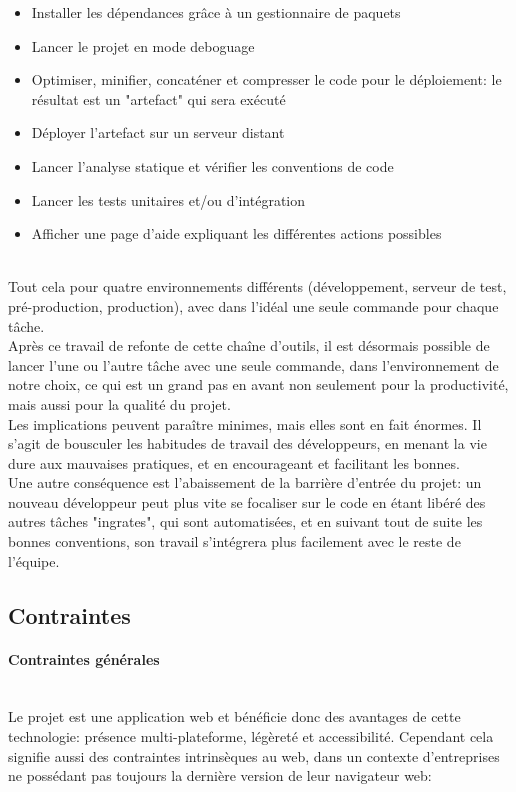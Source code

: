 \documentclass[a4paper,french,12pt]{article}
\begin{document}
	\begin{itemize}
		\item Installer les dépendances grâce à un gestionnaire de paquets
		\item Lancer le projet en mode deboguage
		\item Optimiser, minifier, concaténer et compresser le code pour le déploiement: le résultat est un "artefact" qui sera exécuté
		\item Déployer l'artefact sur un serveur distant
		\item Lancer l'analyse statique et vérifier les conventions de code
		\item Lancer les tests unitaires et/ou d'intégration
		\item Afficher une page d'aide expliquant les différentes actions possibles
	\end{itemize}	 ~\\
	
	Tout cela pour quatre environnements différents (développement, serveur de test, pré-production, production), avec dans l'idéal une seule commande pour chaque tâche.~\\	
	
	Après ce travail de refonte de cette chaîne d'outils, il est désormais possible de lancer l'une ou l'autre tâche avec une seule commande, dans l'environnement de notre choix, ce qui est un grand pas en avant non seulement pour la productivité, mais aussi pour la qualité du projet. ~\\	
	
	Les implications peuvent paraître minimes, mais elles sont en fait énormes. Il s'agit de bousculer les habitudes de travail des développeurs, en menant la vie dure aux mauvaises pratiques, et en encourageant et facilitant les bonnes.~\\	
	
	Une autre conséquence est l'abaissement de la barrière d'entrée du projet: un nouveau développeur peut plus vite se focaliser sur le code en étant libéré des autres tâches "ingrates", qui sont automatisées, et en suivant tout de suite les bonnes conventions, son travail s'intégrera plus facilement avec le reste de l'équipe.
				

	\subsection{Contraintes}
	
	\paragraph{Contraintes générales} ~\\
	Le projet est une application web et bénéficie donc des avantages de cette technologie: présence multi-plateforme, légèreté et accessibilité. Cependant cela signifie aussi des contraintes intrinsèques au web, dans un contexte d'entreprises ne possédant pas toujours la dernière version de leur navigateur web:~\\
	
\end{document}
